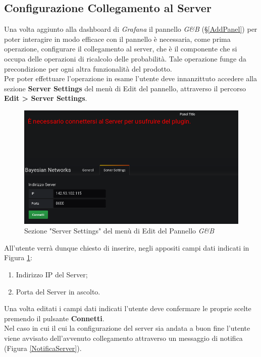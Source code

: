 \subsection{Configurazione Collegamento al Server}\label{CCS}

Una volta aggiunto alla dashboard di \textit{Grafana} il pannello \textit{G\&B} (§\ref{AddPanel}) per poter interagire in modo efficace con il pannello è necessaria, come prima operazione, configurare il collegamento al server, che è il componente che si occupa delle operazioni di ricalcolo delle probabilità. Tale operazione funge da precondizione per ogni altra funzionalità del prodotto.\\
Per poter effettuare l'operazione in esame l'utente deve innanzittuto accedere alla sezione \textbf{Server Settings} del menù di Edit del pannello, attraverso il percorso \textbf{Edit > Server Settings}.

\begin{figure}[H]
	\begin{center}
		\includegraphics[scale=0.5]{./images/ServerSettings.png}
		 \caption{Sezione "Server Settings" del menù di Edit del Pannello \textit{G\&B}}	
		 \label{ServerSettings}
	\end{center}
\end{figure}

All'utente verrà dunque chiesto di inserire, negli appositi campi dati indicati in Figura \ref{ServerSettings}:
\begin{enumerate}
	\item Indirizzo IP del Server;
	\item Porta del Server in ascolto.
\end{enumerate}
Una volta editati i campi dati indicati l'utente deve confermare le proprie scelte premendo il pulsante \textbf{Connetti}.\\
Nel caso in cui il cui la configurazione del server sia andata a buon fine l'utente viene avvisato dell'avvenuto collegamento attraverso un messaggio di notifica (Figura \ref{NotificaServer}).

